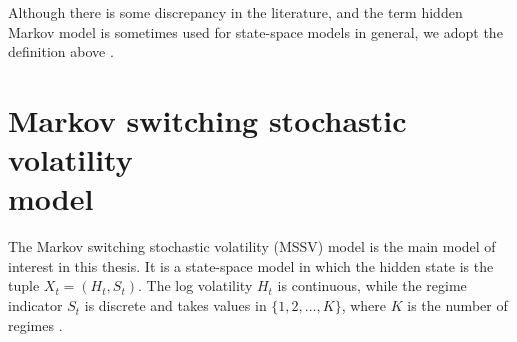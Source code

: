 Although there is some discrepancy in the literature, and the term hidden Markov model is sometimes used for state-space models in general, we adopt the definition above \cite{chopin2020smc}.



\section[Markov switching stochastic volatility model]{Markov switching stochastic volatility\\ model}
\label{sec:mssv}
The Markov switching stochastic volatility (MSSV) model is the main model of interest in this thesis. 
It is a state-space model in which the hidden state is the tuple $X_t = (H_t, S_t)$. The log volatility $H_t$ is continuous, while the regime indicator $S_t$ is discrete and takes values in $\{1, 2, \ldots, K\}$, where $K$ is the number of regimes \cite{so1998stochastic}. 

